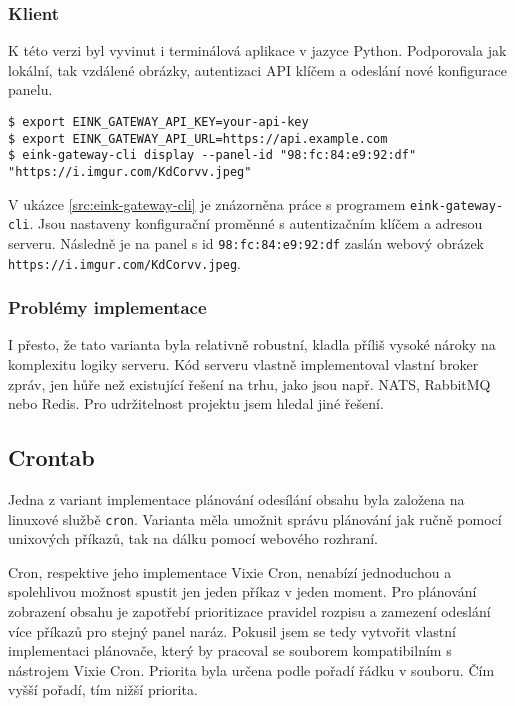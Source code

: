 \subsubsection{Klient}
K této verzi byl vyvinut i terminálová aplikace v jazyce Python. Podporovala jak lokální, tak vzdálené obrázky, autentizaci API klíčem a odeslání nové konfigurace panelu.

\begin{lstlisting}[label=src:eink-gateway-cli,caption={Ukázka programu eink-gateway-cli pro odeslání obrázku na panel}]
$ export EINK_GATEWAY_API_KEY=your-api-key
$ export EINK_GATEWAY_API_URL=https://api.example.com
$ eink-gateway-cli display --panel-id "98:fc:84:e9:92:df" "https://i.imgur.com/KdCorvv.jpeg"
\end{lstlisting}

V ukázce \ref{src:eink-gateway-cli} je znázorněna práce s programem \lstinline|eink-gateway-cli|. Jsou nastaveny konfigurační proměnné s autentizačním klíčem a adresou serveru. Následně je na panel s id \lstinline|98:fc:84:e9:92:df| zaslán webový obrázek \lstinline|https://i.imgur.com/KdCorvv.jpeg|.

\subsubsection{Problémy implementace}
I přesto, že tato varianta byla relativně robustní, kladla příliš vysoké nároky na komplexitu logiky serveru. Kód serveru vlastně implementoval vlastní broker zpráv, jen hůře než existující řešení na trhu, jako jsou např. NATS\cite{NATSIo}, RabbitMQ\cite{RabbitMQOneBroker} nebo Redis\cite{RedisRealtimeData}. Pro udržitelnost projektu jsem hledal jiné řešení.

\subsection{Crontab}
Jedna z variant implementace plánování odesílání obsahu byla založena na linuxové službě \lstinline|cron|. Varianta měla umožnit správu plánování jak ručně pomocí unixových příkazů, tak na dálku pomocí webového rozhraní.

Cron, respektive jeho implementace Vixie Cron, nenabízí jednoduchou a spolehlivou možnost spustit jen jeden příkaz v jeden moment. Pro plánování zobrazení obsahu je zapotřebí prioritizace pravidel rozpisu a zamezení odeslání více příkazů pro stejný panel naráz. Pokusil jsem se tedy vytvořit vlastní implementaci plánovače, který by pracoval se souborem kompatibilním s nástrojem Vixie Cron. Priorita byla určena podle pořadí řádku v souboru. Čím vyšší pořadí, tím nižší priorita.

